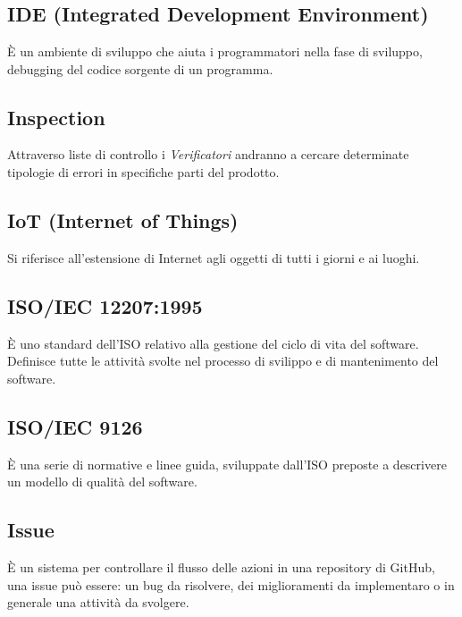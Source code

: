 \section{}
\subsection*{IDE (Integrated Development Environment)} È un ambiente di sviluppo che aiuta i programmatori nella fase di sviluppo, debugging del codice sorgente di un programma.

\subsection*{Inspection} Attraverso liste di controllo i \textit{Verificatori} andranno a cercare determinate tipologie di errori in specifiche parti del prodotto.

\subsection*{IoT (Internet of Things)} Si riferisce all'estensione di Internet agli oggetti di tutti i giorni e ai luoghi.

\subsection*{ISO/IEC 12207:1995} È uno standard dell'ISO relativo alla gestione del ciclo di vita del software. Definisce tutte le attività svolte nel processo di svilippo e di mantenimento del software.

\subsection*{ISO/IEC 9126} È una serie di normative e linee guida, sviluppate dall'ISO preposte a descrivere un modello di qualità del software.

\subsection*{Issue} È un sistema per controllare il flusso delle azioni in una repository di GitHub, una issue può essere: un bug da risolvere, dei miglioramenti da implementaro o in generale una attività da svolgere.
